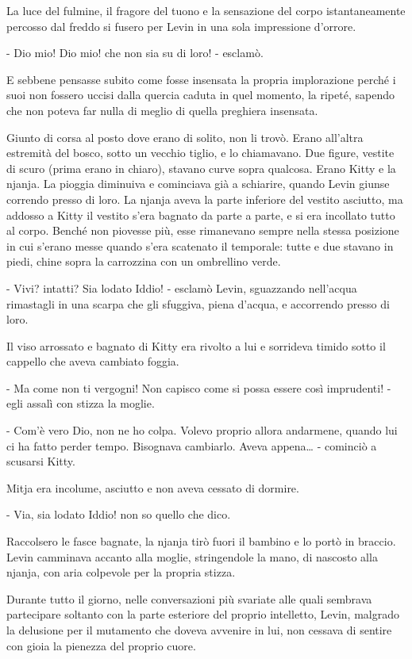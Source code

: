 La luce del fulmine, il fragore del tuono e la sensazione del corpo istantaneamente percosso dal freddo si fusero per Levin in una sola impressione d'orrore. 

- Dio mio! Dio mio! che non sia su di loro! - esclamò. 

E sebbene pensasse subito come fosse insensata la propria implorazione perché i suoi non fossero uccisi dalla quercia caduta in quel momento, la ripeté, sapendo che non poteva far nulla di meglio di quella preghiera insensata. 

Giunto di corsa al posto dove erano di solito, non li trovò. Erano all'altra estremità del bosco, sotto un vecchio tiglio, e lo chiamavano. Due figure, vestite di scuro (prima erano in chiaro), stavano curve sopra qualcosa. Erano Kitty e la njanja. La pioggia diminuiva e cominciava già a schiarire, quando Levin giunse correndo presso di loro. La njanja aveva la parte inferiore del vestito asciutto, ma addosso a Kitty il vestito s'era bagnato da parte a parte, e si era incollato tutto al corpo. Benché non piovesse più, esse rimanevano sempre nella stessa posizione in cui s'erano messe quando s'era scatenato il temporale: tutte e due stavano in piedi, chine sopra la carrozzina con un ombrellino verde. 

- Vivi? intatti? Sia lodato Iddio! - esclamò Levin, sguazzando nell'acqua rimastagli in una scarpa che gli sfuggiva, piena d'acqua, e accorrendo presso di loro. 

Il viso arrossato e bagnato di Kitty era rivolto a lui e sorrideva timido sotto il cappello che aveva cambiato foggia. 

- Ma come non ti vergogni! Non capisco come si possa essere così imprudenti! - egli assalì con stizza la moglie. 

- Com'è vero Dio, non ne ho colpa. Volevo proprio allora andarmene, quando lui ci ha fatto perder tempo. Bisognava cambiarlo. Aveva appena\ldots{} - cominciò a scusarsi Kitty. 

Mitja era incolume, asciutto e non aveva cessato di dormire. 

- Via, sia lodato Iddio! non so quello che dico. 

Raccolsero le fasce bagnate, la njanja tirò fuori il bambino e lo portò in braccio. Levin camminava accanto alla moglie, stringendole la mano, di nascosto alla njanja, con aria colpevole per la propria stizza. 

\label{xviii-7} 

Durante tutto il giorno, nelle conversazioni più svariate alle quali sembrava partecipare soltanto con la parte esteriore del proprio intelletto, Levin, malgrado la delusione per il mutamento che doveva avvenire in lui, non cessava di sentire con gioia la pienezza del proprio cuore. 

